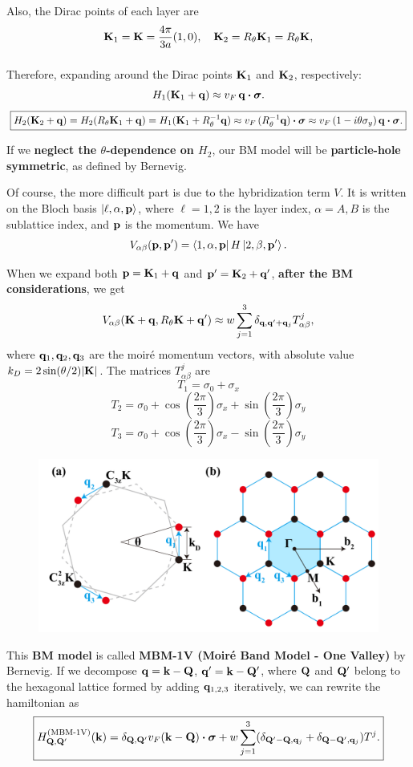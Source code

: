 Also, the Dirac points of each layer are
$$
{\vb{K}}_1 = {\vb{K}} = \frac{4\pi}{3a} (1, 0), \quad {\vb{K}}_2 = R_\theta {\vb{K}}_1 = R_\theta {\vb{K}},
$$
$$
$$

Therefore, expanding around the Dirac points ${\vb{K}}_1$ and ${\vb{K}}_2$, respectively:
$$
H_1(\K_1 + \q) \approx v_F \, \q \vdot \bm{\sigma}.
$$
$$
\boxed{ H_2(\K_2 + \q) = H_2(R_\theta \K_1 + \q) = H_1(\K_1 + R_\theta^{-1}\q) \approx v_F \, (R_\theta^{-1}\q) \vdot \bm{\sigma} \approx v_F \, (1 - i \theta \sigma_y ) \, \q \vdot \bm{\sigma}. }
$$

If we \textbf{neglect the $\theta$-dependence on $H_2$}, our BM model will be \textbf{particle-hole symmetric}, as defined by Bernevig.

\n

Of course, the more difficult part is due to the hybridization term $V$. It is written on the Bloch basis $\ket{\ell, \alpha, {\vb{p}}}$, where $\ell = 1, 2$ is the layer index, $\alpha = A, B$ is the sublattice index, and ${\vb{p}}$ is the momentum.
We have
$$
V_{\alpha\beta}({\vb{p}}, {\vb{p}}') = \bra{1, \alpha, {\vb{p}}} H \ket{2, \beta, {\vb{p}}'}.
$$

When we expand both ${\vb{p}} = {\vb{K}}_1 + {\vb{q}}$ and ${\vb{p}}' = {\vb{K}}_2 + {\vb{q}}'$, \textbf{after the BM considerations}, we get
$$
V_{\alpha\beta}({\vb{K}} + {\vb{q}}, R_\theta {\vb{K}} + {\vb{q}}') \approx
w \sum_{j=1}^{3} \delta_{{\vb{q}}, {\vb{q}}' + {\vb{q}}_j} T_{\alpha\beta}^j,
$$
where ${\vb{q}}_1, {\vb{q}}_2, {\vb{q}}_3$ are the moiré momentum vectors, with absolute value $k_D = 2 \sin(\theta/2) \abs{{\vb{K}}}$. The matrices $T^j_{\alpha\beta}$ are
$$
T_1 = \sigma_0 + \sigma_x
$$
$$
T_2 = \sigma_0 + \cos(\frac{2\pi}{3}) \sigma_x + \sin(\frac{2\pi}{3}) \sigma_y
$$
$$
T_3 = \sigma_0 + \cos(\frac{2\pi}{3}) \sigma_x - \sin(\frac{2\pi}{3}) \sigma_y
$$
\begin{figure}[H]
\centering
\includegraphics[width=0.8\linewidth]{fig/moire-vectors.png}
\end{figure}

\n

This \textbf{BM model} is called \textbf{MBM-1V (Moiré Band Model - One Valley)} by Bernevig. If we decompose ${\vb{q}} = {\vb{k}} - {\vb{Q}}$, ${\vb{q}}'={\vb{k}}-{\vb{Q}}'$, where ${\vb{Q}}$ and ${\vb{Q}}'$ belong to the hexagonal lattice formed by adding ${\vb{q}}_{1,2,3}$ iteratively, we can rewrite the hamiltonian as
$$
\boxed{
H_{\Q, \Q'}^{(\text{MBM-1V})}(\k) =
\delta_{\Q,\Q'} v_F (\k-\Q) \vdot \bm{\sigma}
+ w \sum_{j=1}^{3} (\delta_{\Q'-\Q, \q_j} + \delta_{\Q-\Q', \q_j}) T^j.
}
$$

